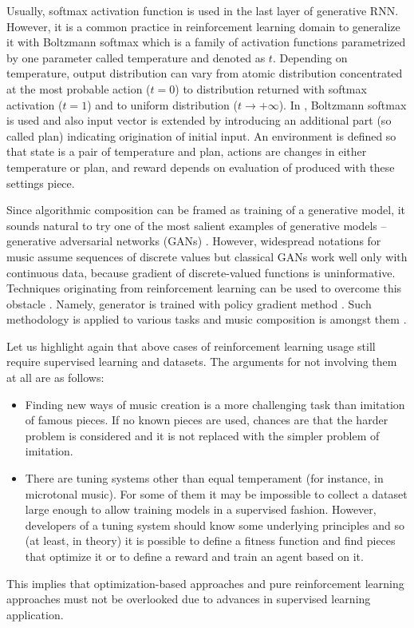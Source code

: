 \documentclass{article}
\begin{document}
Usually, softmax activation function is used in the last layer of generative RNN. However, it is a common practice in reinforcement learning domain to generalize it with Boltzmann softmax which is a family of activation functions parametrized by one parameter called temperature and denoted as $t$. Depending on temperature, output distribution can vary from atomic distribution concentrated at the most probable action ($t = 0$) to distribution returned with softmax activation ($t = 1$) and to uniform distribution ($t \to +\infty$). In \cite{kumar2019polyphonic}, Boltzmann softmax is used and also input vector is extended by introducing an additional part (so called plan) indicating origination of initial input. An environment is defined so that state is a pair of temperature and plan, actions are changes in either temperature or plan, and reward depends on evaluation of produced with these settings piece.

Since algorithmic composition can be framed as training of a generative model, it sounds natural to try one of the most salient examples of generative models -- generative adversarial networks (GANs) \cite{goodfellow2014gan}. However, widespread notations for music assume sequences of discrete values but classical GANs work well only with continuous data, because gradient of discrete-valued functions is uninformative. Techniques originating from reinforcement learning can be used to overcome this obstacle \cite{yu2016seqgan,hjelm2017boundary}. Namely, generator is trained with policy gradient method \cite{williams1992simple}. Such methodology is applied to various tasks and music composition is amongst them \cite{limaguimaraes2017objective}.

Let us highlight again that above cases of reinforcement learning usage still require supervised learning and datasets. The arguments for not involving them at all are as follows:
\begin{itemize}
	\item Finding new ways of music creation is a more challenging task than imitation of famous pieces. If no known pieces are used, chances are that the harder problem is considered and it is not replaced with the simpler problem of imitation.
	\item There are tuning systems other than equal temperament (for instance, in microtonal music). For some of them it may be impossible to collect a dataset large enough to allow training models in a supervised fashion. However, developers of a tuning system should know some underlying principles and so (at least, in theory) it is possible to define a fitness function and find pieces that optimize it or to define a reward and train an agent based on it.
\end{itemize}
This implies that optimization-based approaches and pure reinforcement learning approaches must not be overlooked due to advances in supervised learning application.
\end{document}
